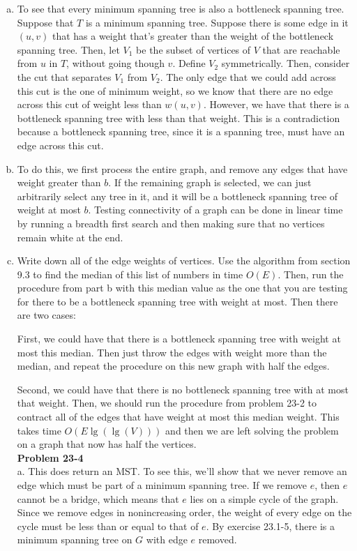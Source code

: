 \documentclass{article}
\begin{document}
\begin{enumerate}[a.]
\item
To see that every minimum spanning tree is also a bottleneck spanning tree. Suppose that $T$ is a minimum spanning tree. Suppose there is some edge in it $(u,v)$ that has a weight that's greater than the weight of the bottleneck spanning tree. Then, let $V_1$ be the subset of vertices of $V$ that are reachable from $u$ in $T$, without going though $v$. Define $V_2$ symmetrically. Then, consider the cut that separates $V_1$ from $V_2$. The only edge that we could add across this cut is the one of minimum weight, so we know that there are no edge across this cut of weight less than $w(u,v)$. However, we have that there is a bottleneck spanning tree with less than that weight. This is a contradiction because a bottleneck spanning tree, since it is a spanning tree, must have an edge across this cut.
\item
To do this, we first process the entire graph, and remove any edges that have weight greater than $b$. If the remaining graph is selected, we can just arbitrarily select any tree in it, and it will be a bottleneck spanning tree of weight at most $b$. Testing connectivity of a graph can be done in linear time by running a breadth first search and then making sure that no vertices remain white at the end.
\item
Write down all of the edge weights of vertices. Use the algorithm from section 9.3 to find the median of this list of numbers in time $O(E)$. Then, run the procedure from part b with this median value as the one that you are testing for there to be a bottleneck spanning tree with weight at most. Then there are two cases:

First, we could have that there is a bottleneck spanning tree with weight at most this median. Then just throw the edges with weight more than the median, and repeat the procedure on this new graph with half the edges.

Second, we could have that there is no bottleneck spanning tree with at most that weight. Then, we should run the procedure from problem 23-2 to contract all of the edges that have weight at most this median weight. This takes time $O(E\lg(\lg(V)))$ and then we are left solving the problem on a graph that now has half the vertices.\\

\noindent\textbf{Problem 23-4}\\

a. This does return an MST.  To see this, we'll show that we never remove an edge which must be part of a minimum spanning tree.  If we remove $e$, then $e$ cannot be a bridge, which means that $e$ lies on a simple cycle of the graph.  Since we remove edges in nonincreasing order, the weight of every edge on the cycle must be less than or equal to that of $e$. By exercise 23.1-5, there is a minimum spanning tree on $G$ with edge $e$ removed.  \\


\end{enumerate}
\end{document}
